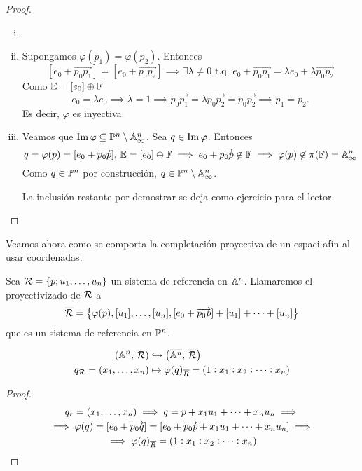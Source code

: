 \begin{proof}
  \begin{enumerate}[i)]
    \item[]
    \item Supongamos $\varphi(p_1) = \varphi(p_2)$. Entonces
    \[
      [e_0 + \overrightarrow{p_0p_1}] = [e_0+\overrightarrow{p_0p_2}]
      \implies \exists \lambda \neq 0 \text{ t.q. } e_0 + \overrightarrow{p_0p_1}
      = \lambda e_0 + \lambda \overrightarrow{p_0p_2}
    \]
    Como $\mathbb{E} = [e_0] \oplus \mathbb{F}$
    \[e_0 = \lambda e_0 \implies \lambda = 1 \implies \overrightarrow{p_0p_1}
    = \lambda \overrightarrow{p_0p_2} = \overrightarrow{p_0p_2} \implies
    p_1 = p_2.\]
    Es decir, $\varphi$ es inyectiva.
    \item Veamos que $\operatorname{Im} \varphi \subseteq \mathbb{P}^n \setminus \mathbb{A}^n_\infty$. Sea
    $q \in \operatorname{Im} \varphi$. Entonces
    \[
      q = \varphi(p) = [e_0+\overrightarrow{p_0p}], \, \mathbb{E} = [e_0] \oplus \mathbb{F}
      \implies e_0 + \overrightarrow{p_0p} \not \in \mathbb{F} \implies
      \varphi(p) \not \in \pi(\mathbb{F}) = \mathbb{A}^n_\infty
    \]
    Como $q \in \mathbb{P}^n$ por construcción, $q \in \mathbb{P}^n \setminus \mathbb{A}^n_\infty$.
    
    La inclusión restante por demostrar se deja como ejercicio para el lector.
  \end{enumerate}
\end{proof}

Veamos ahora como se comporta la completación proyectiva de un espaci afín
al usar coordenadas.

\begin{defi}
  Sea $\mathcal{R} = \left \{p;u_1, \dots, u_n \right \}$ un sistema de referencia en
  $\mathbb{A}^n$. Llamaremos el proyectivizado de $\mathcal{R}$ a
  \[
    \overline{\mathcal{R}} = \left \{ \varphi(p), [u_1], \dots, [u_n], 
    [e_0 + \overrightarrow{p_0p}] + [u_1] + \dots + [u_n] \right \}
  \]
  que es un sistema de referencia en $\mathbb{P}^n$.
\end{defi}

\begin{prop}  
  \[
    \begin{aligned}
      \left( \mathbb{A}^n, \, \mathcal{R} \right) &\hookrightarrow \bigl( \overline{\mathbb{A}^n}, \, \overline{\mathcal{R}} 
      \bigr) \\
      q_{\mathcal{R}} = \left( x_1, \dots, x_n \right) &\mapsto \varphi(q)_{\overline{R}} = \left(
      1 : x_1 : x_2 : \dots : x_n \right)
    \end{aligned}  
  \]
\end{prop}

\begin{proof}
  \begin{gather*}
    q_r = \left( x_1, \dots, x_n \right) \implies q = p + x_1u_1 + \dots + x_nu_n \implies \\
    \implies \varphi(q) = [e_0 + \overrightarrow{p_0q}] = [e_0+\overrightarrow{p_0p}
    + x_1u_1 + \dots + x_nu_n]\implies\\
    \implies \varphi(q)_{\overline{R}} = \left( 1 : x_1 : x_2 : \dots : x_n \right)
  \end{gather*}
\end{proof}

